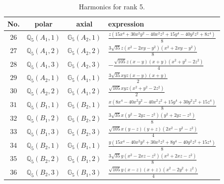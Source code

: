 \documentclass[fleqn,8pt,landscape]{jsarticle}
\begin{document}
\begin{table}[ht!]
\begin{center}
\caption{Harmonics for rank 5.}
\renewcommand{\arraystretch}{1.3}
\begin{tabular}{cccl} \hline \hline
No. & polar & axial & expression \\ \hline
$ 26 $ & $ \mathbb{Q}_{5}(A_{1},1) $ & $ \mathbb{G}_{5}(A_{2},1) $ & $ \frac{z \left(15 x^{4} + 30 x^{2} y^{2} - 40 x^{2} z^{2} + 15 y^{4} - 40 y^{2} z^{2} + 8 z^{4}\right)}{8} $ \\
$ 27 $ & $ \mathbb{Q}_{5}(A_{1},2) $ & $ \mathbb{G}_{5}(A_{2},2) $ & $ \frac{3 \sqrt{35} z \left(x^{2} - 2 x y - y^{2}\right) \left(x^{2} + 2 x y - y^{2}\right)}{8} $ \\
$ 28 $ & $ \mathbb{Q}_{5}(A_{1},3) $ & $ \mathbb{G}_{5}(A_{2},3) $ & $ - \frac{\sqrt{105} z \left(x - y\right) \left(x + y\right) \left(x^{2} + y^{2} - 2 z^{2}\right)}{4} $ \\
$ 29 $ & $ \mathbb{Q}_{5}(A_{2},1) $ & $ \mathbb{G}_{5}(A_{1},1) $ & $ \frac{3 \sqrt{35} x y z \left(x - y\right) \left(x + y\right)}{2} $ \\
$ 30 $ & $ \mathbb{Q}_{5}(A_{2},2) $ & $ \mathbb{G}_{5}(A_{1},2) $ & $ \frac{\sqrt{105} x y z \left(x^{2} + y^{2} - 2 z^{2}\right)}{2} $ \\
$ 31 $ & $ \mathbb{Q}_{5}(B_{1},1) $ & $ \mathbb{G}_{5}(B_{2},1) $ & $ \frac{x \left(8 x^{4} - 40 x^{2} y^{2} - 40 x^{2} z^{2} + 15 y^{4} + 30 y^{2} z^{2} + 15 z^{4}\right)}{8} $ \\
$ 32 $ & $ \mathbb{Q}_{5}(B_{1},2) $ & $ \mathbb{G}_{5}(B_{2},2) $ & $ \frac{3 \sqrt{35} x \left(y^{2} - 2 y z - z^{2}\right) \left(y^{2} + 2 y z - z^{2}\right)}{8} $ \\
$ 33 $ & $ \mathbb{Q}_{5}(B_{1},3) $ & $ \mathbb{G}_{5}(B_{2},3) $ & $ \frac{\sqrt{105} x \left(y - z\right) \left(y + z\right) \left(2 x^{2} - y^{2} - z^{2}\right)}{4} $ \\
$ 34 $ & $ \mathbb{Q}_{5}(B_{2},1) $ & $ \mathbb{G}_{5}(B_{1},1) $ & $ \frac{y \left(15 x^{4} - 40 x^{2} y^{2} + 30 x^{2} z^{2} + 8 y^{4} - 40 y^{2} z^{2} + 15 z^{4}\right)}{8} $ \\
$ 35 $ & $ \mathbb{Q}_{5}(B_{2},2) $ & $ \mathbb{G}_{5}(B_{1},2) $ & $ \frac{3 \sqrt{35} y \left(x^{2} - 2 x z - z^{2}\right) \left(x^{2} + 2 x z - z^{2}\right)}{8} $ \\
$ 36 $ & $ \mathbb{Q}_{5}(B_{2},3) $ & $ \mathbb{G}_{5}(B_{1},3) $ & $ \frac{\sqrt{105} y \left(x - z\right) \left(x + z\right) \left(x^{2} - 2 y^{2} + z^{2}\right)}{4} $ \\
 \hline \hline
\end{tabular}
\end{center}
\end{table}
\end{document}
